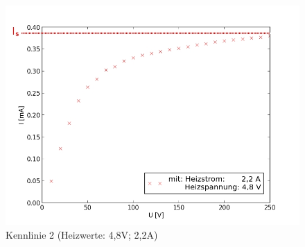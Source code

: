 	\begin{figure}[h]
		\begin{center}
		\includegraphics[scale=0.75]{pica2.jpg}
		\caption{Kennlinie 2 (Heizwerte: 4,8V; 2,2A)}
		\label{pica2}
		\end{center}	
	\end{figure}